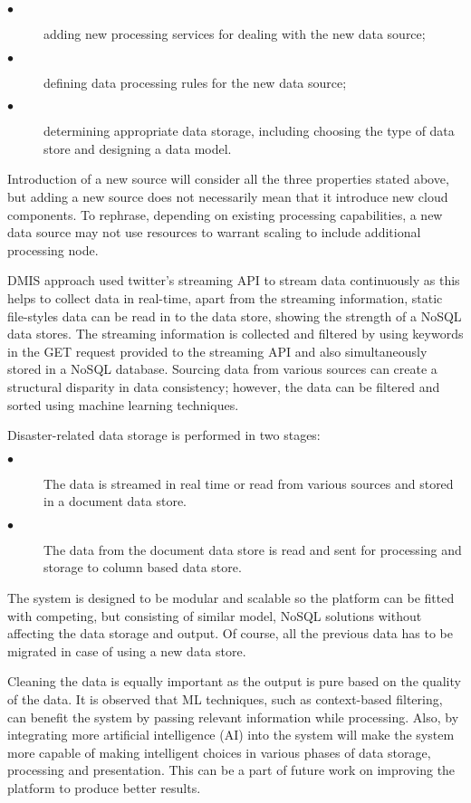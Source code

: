 \begin{description}
	\item[$\bullet$]
	adding new processing services for dealing with the new data source;
	
	\item[$\bullet$]
	defining data processing rules for the new data source;
	
	\item[$\bullet$]
	determining appropriate data storage, including choosing the type of data store and designing a data model.	 
\end{description}

Introduction of a new source will consider all the three properties stated above, but adding a new source does not necessarily mean that it introduce new cloud components. To rephrase, depending on existing processing capabilities, a new data source may not use resources to warrant scaling to include additional processing node.

DMIS approach used twitter's streaming API to stream data continuously as this helps to collect data in real-time, apart from the streaming information,  static file-styles data can be read in to the data store, showing the strength of a NoSQL data stores. The streaming information is collected and filtered by using keywords in the GET request provided to the streaming API and also simultaneously stored in a NoSQL database. Sourcing data from various sources can create a structural disparity in data consistency; however, the data can be filtered and sorted using machine learning techniques.

Disaster-related data storage is performed in two stages:

\begin{description}
	\item[$\bullet$]
	The data is streamed in real time or read from various sources and stored in a document data store.
	
	\item[$\bullet$]
	The data from the document data store is read and sent for processing and storage to column based data store.	 
\end{description}

The system is designed to be modular and scalable so the platform can be fitted with competing, but consisting of similar model, NoSQL solutions without affecting the data storage and output. Of course, all the previous data has to be migrated in case of using a new data store.

Cleaning the data is equally important as the output is pure based on the quality of the data. It is observed that ML techniques, such as context-based filtering, can benefit the system by passing relevant information while processing. Also, by integrating more artificial intelligence (AI) into the system will make the system more capable of making intelligent choices in various phases of data storage, processing and presentation. This can be a part of future work on improving the platform to produce better results.